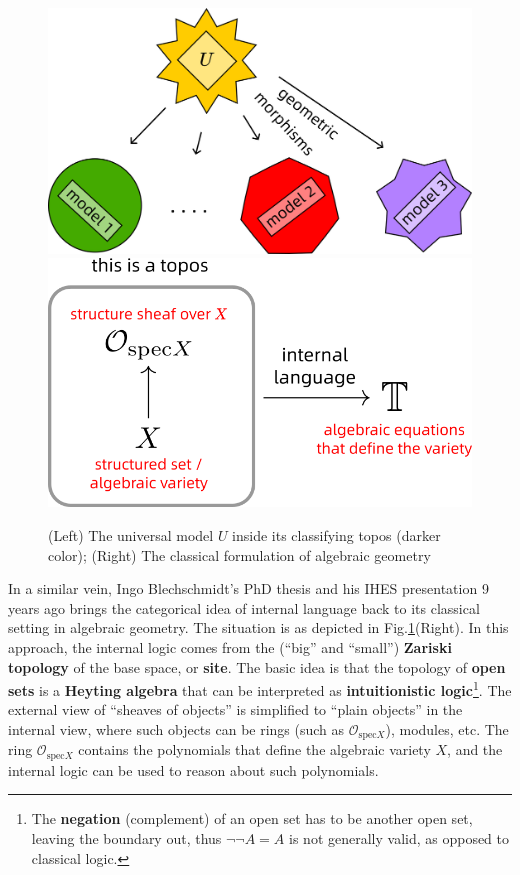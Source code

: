 \documentclass[runningheads]{llncs}
\begin{document}
\begin{figure}
	\includegraphics[scale=.25]{Caramello-picture.png} \qquad
	\includegraphics[scale=.5]{geometric-topos.png}
	\caption{(Left) The universal model $U$ inside its classifying topos (darker color); (Right) The classical formulation of algebraic geometry}
	\label{fig:Caramello-pic}
\end{figure}

In a similar vein, Ingo Blechschmidt's PhD thesis \cite{Blechschmidt2017} and his IHES presentation 9 years ago \cite{Blechschmidt-video2015} brings the categorical idea of internal language back to its classical setting in algebraic geometry.  The situation is as depicted in Fig.\ref{fig:Caramello-pic}(Right).  In this approach, the internal logic comes from the (``big'' and ``small'') \textbf{Zariski topology} of the base space, or \textbf{site}.  The basic idea is that the topology of \textbf{open sets} is a \textbf{Heyting algebra} that can be interpreted as \textbf{intuitionistic logic}\footnote{The \textbf{negation} (complement) of an open set has to be another open set, leaving the boundary out, thus $\neg \neg A = A$ is not generally valid, as opposed to classical logic.}.  The external view of ``sheaves of objects'' is simplified to ``plain objects'' in the internal view, where such objects can be rings (such as $\mathcal{O}_{\mathrm{spec} X}$), modules, etc.  The ring $\mathcal{O}_{\mathrm{spec} X}$ contains the polynomials that define the algebraic variety $X$, and the internal logic can be used to reason about such polynomials.
\end{document}
